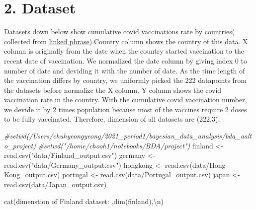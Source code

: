 \documentclass[
]{article}
\newenvironment{Shaded}{\begin{snugshade}}{\end{snugshade}}
\newcommand{\CommentTok}[1]{\textcolor[rgb]{0.56,0.35,0.01}{\textit{#1}}}
\newcommand{\FunctionTok}[1]{\textcolor[rgb]{0.00,0.00,0.00}{#1}}
\newcommand{\NormalTok}[1]{#1}
\newcommand{\OtherTok}[1]{\textcolor[rgb]{0.56,0.35,0.01}{#1}}
\newcommand{\SpecialCharTok}[1]{\textcolor[rgb]{0.00,0.00,0.00}{#1}}
\newcommand{\StringTok}[1]{\textcolor[rgb]{0.31,0.60,0.02}{#1}}
\begin{document}
\hypertarget{dataset}{%
\section{2. Dataset}\label{dataset}}

Datasets down below show cumulative covid vaccinations rate by
countries( collected from
\href{https://ourworldindata.org/covid-vaccinations}{linked
phrase}).Country column shows the country of this data. X column is
originally from the date when the country started vaccination to the
recent date of vaccination. We normalized the date column by giving
index 0 to number of date and deviding it with the number of date. As
the time length of the vaccination differs by country, we uniformly
picked the 222 datapoints from the datasets before normalize the X
column. Y column shows the covid vaccination rate in the country. With
the cumulative covid vaccination number, we devide it by 2 times
population because most of the vaccines require 2 doses to be fully
vaccinated. Therefore, dimension of all datasets are (222,3).

\begin{Shaded}
\begin{Highlighting}[]
\CommentTok{\#setwd(\textquotesingle{}/Users/chuhyeongyeong/2021\_period1/bayesian\_data\_analysis/bda\_aalto\_project\textquotesingle{})}
\CommentTok{\#setwd("/home/chooh1/notebooks/BDA/project")}
\NormalTok{finland }\OtherTok{\textless{}{-}} \FunctionTok{read.csv}\NormalTok{(}\StringTok{"data/Finland\_output.csv"}\NormalTok{)}
\NormalTok{germany }\OtherTok{\textless{}{-}} \FunctionTok{read.csv}\NormalTok{(}\StringTok{"data/Germany\_output.csv"}\NormalTok{)}
\NormalTok{hongkong }\OtherTok{\textless{}{-}} \FunctionTok{read.csv}\NormalTok{(}\StringTok{\textquotesingle{}data/Hong Kong\_output.csv\textquotesingle{}}\NormalTok{)}
\NormalTok{portugal }\OtherTok{\textless{}{-}} \FunctionTok{read.csv}\NormalTok{(}\StringTok{\textquotesingle{}data/Portugal\_output.csv\textquotesingle{}}\NormalTok{)}
\NormalTok{japan }\OtherTok{\textless{}{-}} \FunctionTok{read.csv}\NormalTok{(}\StringTok{\textquotesingle{}data/Japan\_output.csv\textquotesingle{}}\NormalTok{)}
\end{Highlighting}
\end{Shaded}

\begin{Shaded}
\begin{Highlighting}[]
\FunctionTok{cat}\NormalTok{(}\StringTok{\textquotesingle{}dimenstion of Finland dataset: \textquotesingle{}}\NormalTok{,}\FunctionTok{dim}\NormalTok{(finland),}\StringTok{\textquotesingle{}}\SpecialCharTok{\textbackslash{}n}\StringTok{\textquotesingle{}}\NormalTok{)}
\end{Highlighting}
\end{Shaded}
\end{document}
